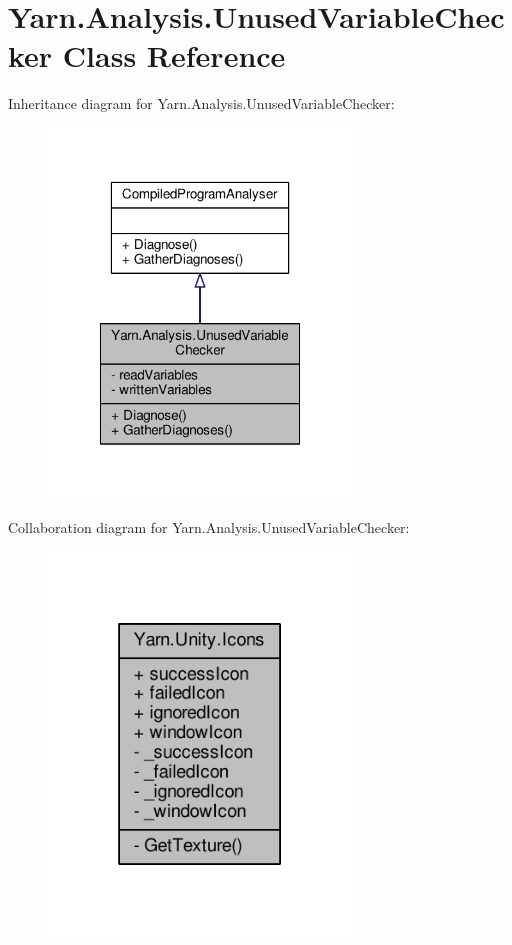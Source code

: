 \hypertarget{a00098}{\section{Yarn.\-Analysis.\-Unused\-Variable\-Checker Class Reference}
\label{a00098}
}


Inheritance diagram for Yarn.\-Analysis.\-Unused\-Variable\-Checker\-:
\nopagebreak
\begin{figure}[H]
\begin{center}
\leavevmode
\includegraphics[width=228pt]{a00345}
\end{center}
\end{figure}


Collaboration diagram for Yarn.\-Analysis.\-Unused\-Variable\-Checker\-:
\nopagebreak
\begin{figure}[H]
\begin{center}
\leavevmode
\includegraphics[width=228pt]{a00346}
\end{center}
\end{figure}
